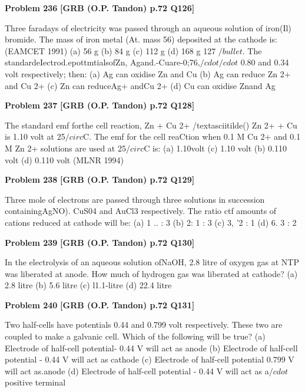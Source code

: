 \begin{problembox}
\textbf{Problem 236} \hfill \textbf{[GRB (O.P. Tandon) p.72 Q126]}
\label{q:ext-grb_all_questions-236}

Three faradays of electricity was passed through an aqueous 
solution of iron(Il) bromide. The mass of iron metal (At. mass 
56) deposited at the cathode is: 
(EAMCET 1991) 
(a) 56 g 
(b) 84 g 
(c) 112 g 
(d) 168 g 
127 $/bullet$. The standardeIectrod.epottmtialsofZn, Agand.-Cuare-0;76,$/cdot$$/cdot$ 
0.80 and 0.34 volt respectively; then: 
(a) Ag can oxidise Zn and Cu 
(b) Ag can reduce Zn 2+ and Cu 2+ 
(c) Zn can reduceAg+ andCu 2+ 
(d) Cu can oxidise Znand Ag
\end{problembox}

\begin{problembox}
\textbf{Problem 237} \hfill \textbf{[GRB (O.P. Tandon) p.72 Q128]}
\label{q:ext-grb_all_questions-237}

The standard emf forthe cell reaction, 
Zn + Cu 2+ /textasciitilde() 
Zn 2+ + Cu 
is 1.10 volt at 25$/circ$C. The emf for the cell reaCtion when 0.1 M 
Cu 2+ and 0.1 M Zn 2+ solutions are used at 25$/circ$C is: 
(a) 1.10volt 
(c) 
1.10 volt 
(b) 0.110 volt 
(d) 
0.110 volt 
(MLNR 1994)
\end{problembox}

\begin{problembox}
\textbf{Problem 238} \hfill \textbf{[GRB (O.P. Tandon) p.72 Q129]}
\label{q:ext-grb_all_questions-238}

Three mole of electrons are passed through three solutions in 
succession containingAgNO). CuS04 and AuCl3 respectively. 
The ratio ctf amounts of cations reduced at cathode will be: 
(a) 1 .. : 3 
(b) 2: 1 : 3 
(c) 3, '2 : 1 
(d) 6. 3 : 2
\end{problembox}

\begin{problembox}
\textbf{Problem 239} \hfill \textbf{[GRB (O.P. Tandon) p.72 Q130]}
\label{q:ext-grb_all_questions-239}

In the electrolysis of an aqueous solution ofNaOH, 2.8 litre of 
oxygen gas at NTP was liberated at anode. How much of 
hydrogen gas was liberated at cathode? 
(a) 2.8 litre 
(b) 5.6 litre 
(c) l1.1-litre 
(d) 22.4 litre
\end{problembox}

\begin{problembox}
\textbf{Problem 240} \hfill \textbf{[GRB (O.P. Tandon) p.72 Q131]}
\label{q:ext-grb_all_questions-240}

Two half-cells have potentials 
0.44 and 0.799 volt 
respectively. These two are coupled to make a galvanic cell. 
Which of the following will be true? 
(a) Electrode of half-cell potential- 0.44 V will act as anode 
(b) Electrode of half-cell potential - 0.44 V will act as 
cathode 
(c) Electrode of half-cell potential 0.799 V will act as.anode 
(d) Electrode of half-cell potential - 0.44 V will act as a$/cdot$ 
positive terminal
\end{problembox}

